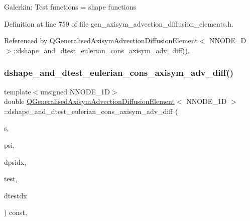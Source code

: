 Galerkin\+: Test functions = shape functions 

Definition at line 759 of file gen\+\_\+axisym\+\_\+advection\+\_\+diffusion\+\_\+elements.\+h.



Referenced by Q\+Generalised\+Axisym\+Advection\+Diffusion\+Element$<$ N\+N\+O\+D\+E\+\_\+D $>$\+::dshape\+\_\+and\+\_\+dtest\+\_\+eulerian\+\_\+cons\+\_\+axisym\+\_\+adv\+\_\+diff().

\mbox{\label{classQGeneralisedAxisymAdvectionDiffusionElement_ae0fbfa30e85f9a3fdc53b62c24a18395}} 
\subsubsection{\texorpdfstring{dshape\+\_\+and\+\_\+dtest\+\_\+eulerian\+\_\+cons\+\_\+axisym\+\_\+adv\+\_\+diff()}{dshape\_and\_dtest\_eulerian\_cons\_axisym\_adv\_diff()}}
{\footnotesize\ttfamily template$<$unsigned N\+N\+O\+D\+E\+\_\+1D$>$ \\
double \hyperlink{classQGeneralisedAxisymAdvectionDiffusionElement}{Q\+Generalised\+Axisym\+Advection\+Diffusion\+Element}$<$ N\+N\+O\+D\+E\+\_\+1D $>$\+::dshape\+\_\+and\+\_\+dtest\+\_\+eulerian\+\_\+cons\+\_\+axisym\+\_\+adv\+\_\+diff (\begin{DoxyParamCaption}\item[{const Vector$<$ double $>$ \&}]{s,  }\item[{Shape \&}]{psi,  }\item[{D\+Shape \&}]{dpsidx,  }\item[{Shape \&}]{test,  }\item[{D\+Shape \&}]{dtestdx }\end{DoxyParamCaption}) const\hspace{0.3cm}{\ttfamily [inline]}, {\ttfamily [protected]}}



